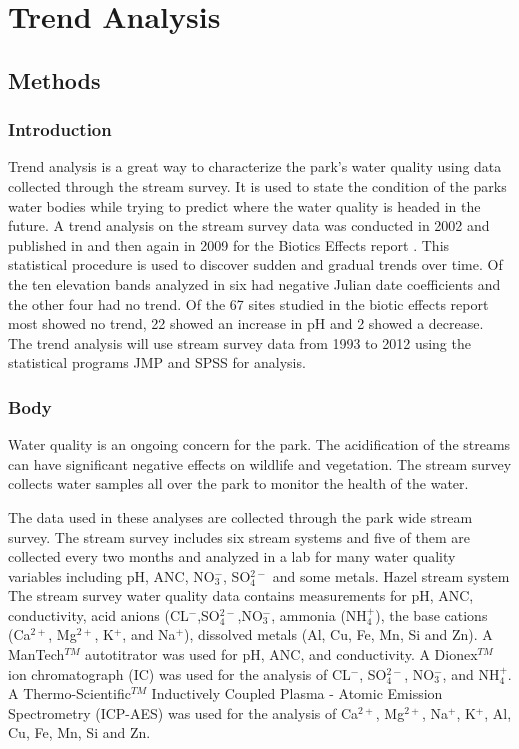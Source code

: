 \chapter{Trend Analysis}\label{ch:TA}
\section{Methods}
\subsection{Introduction}

Trend analysis is a great way to characterize the park's water quality using data collected through the stream survey. It is used to state the condition of the parks water bodies while trying to predict where the water quality is headed in the future. A trend analysis on the stream survey data was conducted in 2002 and published in \citet{robinson2008ph} and then again in 2009 for the Biotics Effects report \citep{cai2012}. This statistical procedure is used to discover sudden and gradual trends over time. Of the ten elevation bands analyzed in \citet{robinson2008ph} six had negative Julian date coefficients and the other four had no trend. Of the 67 sites studied in the biotic effects report most showed no trend, 22 showed an increase in pH and 2 showed a decrease\citep{cai2012}. The trend analysis will use stream survey data from 1993 to 2012 using the statistical programs JMP and SPSS for analysis.

\subsection{Body}

Water quality is an ongoing concern for the park. The acidification of the streams can have significant negative effects on wildlife and vegetation. The stream survey collects water samples all over the park to monitor the health of the water. 
    
 The data used in these analyses are collected through the park wide stream survey. The stream survey includes six stream systems and five of them are collected every two months and analyzed in a lab for many water quality variables including pH, ANC, NO$_3^-$, SO$_4^{2-}$ and some metals.  Hazel stream system %
The stream survey water quality data contains measurements for pH, ANC, conductivity, acid anions (CL$^-$,SO$_4^{2-}$,NO$_3^-$, ammonia (NH$_4^+$), the base cations (Ca$^{2+}$, Mg$^{2+}$, K$^+$, and Na$^+$), dissolved metals (Al, Cu, Fe, Mn, Si and Zn).  A ManTech$^{TM}$ autotitrator was used for pH, ANC, and conductivity.  A Dionex$^{TM}$ ion chromatograph (IC) was used for the analysis of CL$^-$, SO$_4^{2-}$, NO$_3^-$, and NH$_4^+$.  A Thermo-Scientific$^{TM}$ Inductively Coupled Plasma - Atomic Emission Spectrometry (ICP-AES) was used for the analysis of Ca$^{2+}$, Mg$^{2+}$, Na$^+$, K$^+$, Al, Cu, Fe, Mn, Si and Zn.

